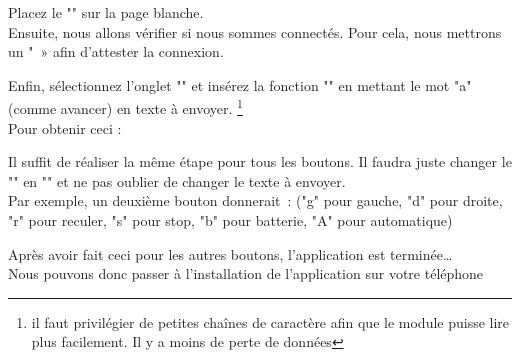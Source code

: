 Placez le "" sur la page blanche. \\

Ensuite, nous allons vérifier si nous sommes connectés. Pour cela, nous mettrons un " » afin d’attester la connexion.

Enfin, sélectionnez l'onglet "" et insérez la fonction "" en mettant le mot "a" (comme avancer) en texte à envoyer. \footnote{il faut privilégier de petites chaînes de caractère afin que le module puisse lire plus facilement. Il y a moins de perte de données} \\
Pour obtenir ceci : 



Il suffit de réaliser la même étape pour tous les boutons. Il faudra juste changer le "" en "" et ne pas oublier de changer le texte à envoyer. \\


Par exemple, un deuxième bouton donnerait :  ("g" pour gauche, "d" pour droite, "r" pour reculer, "s" pour stop, "b" pour batterie, "A" pour automatique)


Après avoir fait ceci pour les autres boutons, l'application est terminée… \\
Nous pouvons donc passer à l'installation de l'application sur votre téléphone